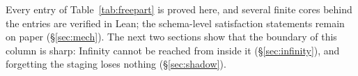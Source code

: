 Every entry of Table~\ref{tab:freepart} is proved here, and several finite cores behind the
entries are verified in Lean; the schema-level satisfaction statements remain on paper
(\S\ref{sec:mech}). The next two sections show that the boundary of this column is sharp:
Infinity cannot be reached from inside it (\S\ref{sec:infinity}), and forgetting the staging
loses nothing (\S\ref{sec:shadow}).
